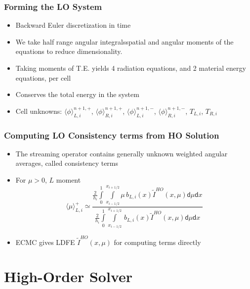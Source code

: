 \documentclass[xcolor=dvipsnames,hyperref={pdfpagelabels=false},handout,unknownkeysallowed]{beamer}
\newcommand{\colb}[1]{{\color{blue} #1}}
\newlength{\wideitemsep}
\let\olditem\item
\renewcommand{\item}{\setlength{\itemsep}{\wideitemsep}\olditem}
\renewcommand{\d}{\mathsf{d}}
\newcommand{\mom}[1]{\langle #1 \rangle}
\newcommand{\xl}{{x_{i-1/2}}}
\newcommand{\xr}{{x_{i+1/2}}}
\begin{document}
\begin{frame}
    \frametitle{Forming the LO System}
    \begin{itemize}
    \item Backward Euler discretization in time
    \item We take half range angular integralsspatial and angular moments of the equations to reduce
        dimensionality.
    \item Taking moments of T.E. yields 4 radiation equations, and 2 material energy
        equations, per cell

    \item Conserves the total energy in the system

    \item Cell unknowns: $\mom{\phi}_{L,i}^{n+1,+}$, $\mom{\phi}_{R,i}^{n+1,+}$,
        $\mom{\phi}_{L,i}^{n+1,-}$, $\mom{\phi}_{R,i}^{n+1,-}$, $T_{L,i}$, $T_{R,i}$

    \end{itemize}
\end{frame}


\begin{frame}
    \frametitle{Computing LO Consistency terms from HO Solution}
    \begin{itemize}
        \item The streaming operator contains generally unknown weighted angular averages,
            called \colb{consistency terms}
        \item For $\mu>0$, $L$ moment
    \begin{equation}
\mom{{\mu}}_{L,i}^{+} \simeq \frac{\displaystyle 
\frac{2}{h_i} \int\limits_0^1 \int\limits_\xl^\xr \mu \, b_{L,i}(x) \tilde I^{HO}(x,\mu) \d \mu \d x } 
{\displaystyle \frac{2}{h_i} \int\limits_0^1 \int\limits_\xl^\xr \, b_{L,i}(x)
\tilde I^{HO}(x,\mu) \d \mu \d x } 
    \end{equation}
        \item ECMC gives LDFE $\tilde  I^{HO}(x,\mu)$ for computing terms directly
    \end{itemize}
\end{frame}



\section{High-Order Solver}
\end{document}
